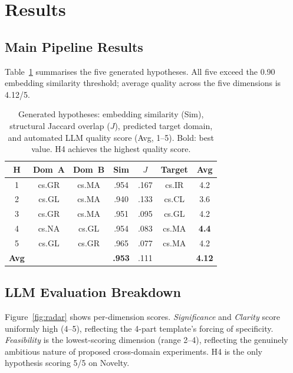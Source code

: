 \documentclass[11pt]{article}
\begin{document}
\section{Results}

\subsection{Main Pipeline Results}

Table~\ref{tab:hypotheses} summarises the five generated hypotheses.
All five exceed the 0.90 embedding similarity threshold; average quality
across the five dimensions is 4.12/5.

\begin{table}[h]
\small
\centering
\setlength{\tabcolsep}{3pt}
\begin{tabular}{ccccccc}
\toprule
\textbf{H} & \textbf{Dom~A} & \textbf{Dom~B} & \textbf{Sim} & \textbf{$J$} & \textbf{Target} & \textbf{Avg}\\
\midrule
1 & cs.GR & cs.MA & .954 & .167 & cs.IR & 4.2 \\
2 & cs.GL & cs.MA & .940 & .133 & cs.CL & 3.6 \\
3 & cs.GR & cs.MA & .951 & .095 & cs.GL & 4.2 \\
4 & cs.NA & cs.GL & .954 & .083 & cs.MA & \textbf{4.4} \\
5 & cs.GL & cs.GR & .965 & .077 & cs.MA & 4.2 \\
\midrule
\textbf{Avg} & & & \textbf{.953} & .111 & & \textbf{4.12}\\
\bottomrule
\end{tabular}
\caption{Generated hypotheses: embedding similarity (Sim), structural
  Jaccard overlap ($J$), predicted target domain, and automated
  LLM quality score (Avg, 1--5). Bold: best value. H4 achieves the
  highest quality score.}
\label{tab:hypotheses}
\end{table}

\subsection{LLM Evaluation Breakdown}

Figure~\ref{fig:radar} shows per-dimension scores. \emph{Significance}
and \emph{Clarity} score uniformly high (4--5), reflecting the 4-part
template's forcing of specificity. \emph{Feasibility} is the lowest-scoring
dimension (range 2--4), reflecting the genuinely ambitious nature of proposed
cross-domain experiments. H4 is the only hypothesis scoring 5/5 on Novelty.
\end{document}
